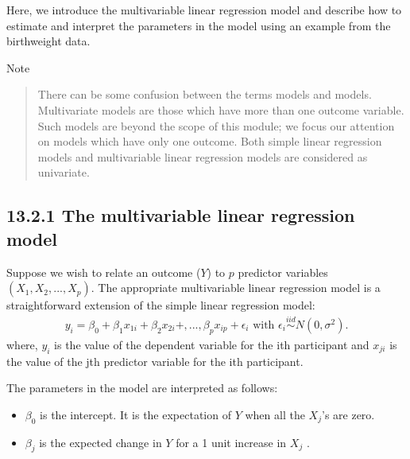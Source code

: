\documentclass[letterpaper,10pt,english]{jupyterBook}
\begin{document}
\sphinxAtStartPar
Here, we introduce the multivariable linear regression model and describe how to estimate and interpret the parameters in the model using an example from the birthweight data.

\sphinxAtStartPar
Note
\begin{quote}

\sphinxAtStartPar
{} There can be some confusion between the terms  models and  models. Multivariate models are those which have more than one outcome variable. Such models are beyond the scope of this module; we focus our attention on  models which have only one outcome. Both simple linear regression models and multivariable linear regression models are considered as univariate.
\end{quote}


\subsection{13.2.1 The multivariable linear regression model}
\label{\detokenize{13.c. Linear Regression II:the-multivariable-linear-regression-model}}
\sphinxAtStartPar
Suppose we wish to relate an outcome (\(Y\)) to \(p\) predictor variables \((X_1, X_2, ..., X_p)\). The appropriate multivariable linear regression model is a straightforward extension of the simple linear regression model:
\begin{equation*}
\begin{split} 
y_i = \beta_0 + \beta_1 x_{1i} + \beta_2 x_{2i} + ,..., \beta_p x_{ip}+\epsilon_i \text{ with } \epsilon_i \overset{iid}{\sim} N(0,\sigma^2).
\end{split}
\end{equation*}
\sphinxAtStartPar
where, \(y_i\) is the value of the dependent variable for the ith participant and \(x_{ji}\) is the value of the jth predictor variable for the ith participant.

\sphinxAtStartPar
The parameters in the model are interpreted as follows:
\begin{itemize}
\item {} 
\sphinxAtStartPar
\(\beta_0\) is the intercept. It is the expectation of \(Y\) when all the \(X_j\)’s are zero.

\item {} 
\sphinxAtStartPar
\(\beta_j\) is the expected change in \(Y\) for a 1 unit increase in \(X_j\) .

\end{itemize}
\end{document}
